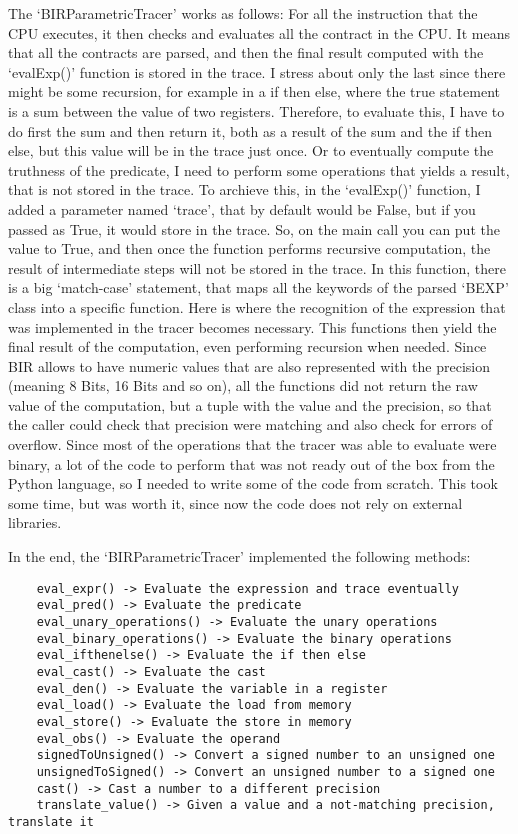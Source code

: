The `BIRParametricTracer' works as follows: For all the instruction that the CPU
executes, it then checks and evaluates all the contract in the CPU. It means that
all the contracts are parsed, and then the final result computed with the `evalExp()'
function is stored in the trace. I stress about only the last since there might be
some recursion, for example in a if then else, where the true statement is a sum
between the value of two registers. Therefore, to evaluate this, I have to do
first the sum and then return it, both as a result of the sum and the if then else,
but this value will be in the trace just once. Or to eventually compute the truthness
of the predicate, I need to perform some operations that yields a result, that is
not stored in the trace. To archieve this, in the `evalExp()' function, I added
a parameter named `trace', that by default would be False, but if you passed as
True, it would store in the trace. So, on the main call you can put the value to
True, and then once the function performs recursive computation, the result of intermediate
steps will not be stored in the trace. In this function, there is a big `match-case'
statement, that maps all the keywords of the parsed `BEXP' class into a specific
function. Here is where the recognition of the expression that was implemented in
the tracer becomes necessary. This functions then yield the final result of the
computation, even performing recursion when needed. Since BIR allows to have
numeric values that are also represented with the precision (meaning 8 Bits, 16
Bits and so on), all the functions did not return the raw value of the
computation, but a tuple with the value and the precision, so that the caller
could check that precision were matching and also check for errors of overflow. Since
most of the operations that the tracer was able to evaluate were binary, a lot
of the code to perform that was not ready out of the box from the Python
language, so I needed to write some of the code from scratch. This took some
time, but was worth it, since now the code does not rely on external libraries.

In the end, the `BIRParametricTracer' implemented the following methods:
\begin{verbatim}
    eval_expr() -> Evaluate the expression and trace eventually
    eval_pred() -> Evaluate the predicate
    eval_unary_operations() -> Evaluate the unary operations 
    eval_binary_operations() -> Evaluate the binary operations
    eval_ifthenelse() -> Evaluate the if then else
    eval_cast() -> Evaluate the cast
    eval_den() -> Evaluate the variable in a register
    eval_load() -> Evaluate the load from memory
    eval_store() -> Evaluate the store in memory
    eval_obs() -> Evaluate the operand
    signedToUnsigned() -> Convert a signed number to an unsigned one
    unsignedToSigned() -> Convert an unsigned number to a signed one
    cast() -> Cast a number to a different precision
    translate_value() -> Given a value and a not-matching precision, translate it
\end{verbatim}

